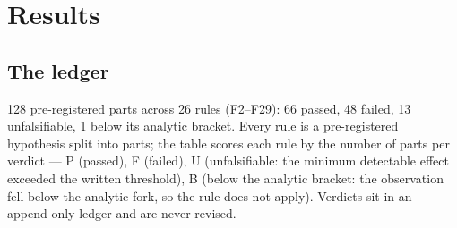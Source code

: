 \documentclass[11pt,a4paper]{article}
\theoremstyle{remark}
\begin{document}
\section{Results}\label{sec:results}
\subsection{The ledger}
128 pre-registered parts across 26 rules (F2--F29): 66 passed, 48 failed, 13
unfalsifiable, 1 below its analytic bracket. Every rule is a pre-registered hypothesis
split into parts; the table scores each rule by the number of parts per verdict ---
P (passed), F (failed), U (unfalsifiable: the minimum detectable effect exceeded the
written threshold), B (below the analytic bracket: the observation fell below the
analytic fork, so the rule does not apply). Verdicts sit in an append-only ledger and
are never revised.
\end{document}
